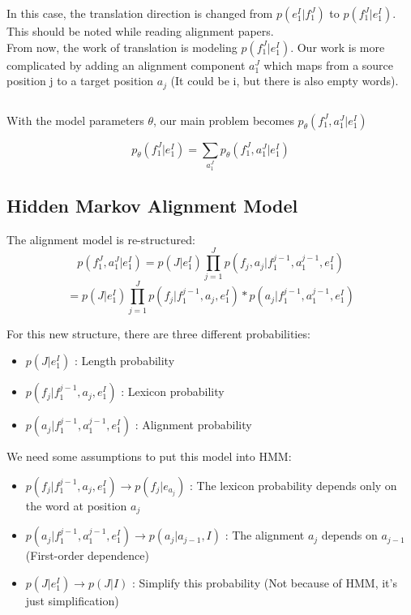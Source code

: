 \documentclass{article}
\begin{document}
In this case, the translation direction is changed from $p(e_1^I|f_1^J)$ to $p(f_1^J|e_1^I)$. This should be noted while reading alignment papers. \\

From now, the work of translation is modeling $p(f_1^J|e_1^I)$. Our work is more complicated by adding an alignment component $a_1^J$ which maps from a source position j to a target position $a_j$ (It could be i, but there is also empty words).

\begin{equation}
\end{equation}

With the model parameters $\theta$, our main problem becomes $p_{\theta}(f_1^J, a_1^J|e_1^I)$

\begin{equation}
p_{\theta}(f_1^J|e_1^I) = \sum_{a_1^J} p_{\theta}(f_1^J, a_1^J|e_1^I)
\label{Overview about Statistical Alignment p(f,e)}
\end{equation}


\subsection{Hidden Markov Alignment Model \cite{Och2003Systematic}}
The alignment model is re-structured:
\begin{equation}
p(f_1^J, a_1^J|e_1^I) = p(J|e_1^I) \prod_{j=1}^J p(f_j, a_j | f_1^{j-1}, a_1^{j-1}, e_1^I)
\end{equation}
\begin{equation}
= p(J|e_1^I) \prod_{j=1}^J p( f_j | f_1^{j-1}, a_j, e_1^I) * p( a_j | f_1^{j-1}, a_1^{j-1}, e_1^I)
\end{equation}

For this new structure, there are three different probabilities:
\begin{itemize}
\item $p(J|e_1^I)$ : Length probability
\item $p( f_j | f_1^{j-1}, a_j, e_1^I)$ : Lexicon  probability
\item $p( a_j | f_1^{j-1}, a_1^{j-1}, e_1^I)$ : Alignment probability
\end{itemize}

We need some assumptions to put this model into HMM:
\begin{itemize}
\item $p( f_j | f_1^{j-1}, a_j, e_1^I) \rightarrow p(f_j | e_{a_j}) $ : The lexicon probability depends only on the word at position $a_j$
\item $p( a_j | f_1^{j-1}, a_1^{j-1}, e_1^I) \rightarrow p(a_j | a_{j-1}, I) $ : The alignment $a_j$ depends on $a_{j - 1}$  (First-order dependence)
\item $p(J|e_1^I) \rightarrow p(J|I)$ : Simplify this probability (Not because of HMM, it's just simplification)
\end{itemize}
\end{document}
